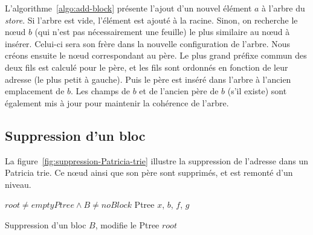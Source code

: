L'algorithme~\ref{algo:add-block} présente l'ajout d'un nouvel élément $a$ à
l'arbre du {\em store}.
Si l'arbre est vide, l'élément est ajouté à la racine.
Sinon, on recherche le n\oe{}ud $b$ (qui n'est pas nécessairement une feuille)
le plus similaire au n\oe{}ud à insérer.
Celui-ci sera son frère dans la nouvelle configuration de l'arbre.
Nous créons ensuite le n\oe{}ud correspondant au père.
Le plus grand préfixe commun des deux fils est calculé pour le père, et les fils
sont ordonnés en fonction de leur adresse (le plus petit à gauche).
Puis le père est inséré dans l'arbre à l'ancien emplacement de $b$.
Les champs de $b$ et de l'ancien père de $b$ (s'il existe) sont également mis à
jour pour maintenir la cohérence de l'arbre.


\subsection{Suppression d'un bloc}


La figure~\ref{fig:suppression-Patricia-trie} illustre la suppression de
l'adresse  dans un Patricia trie.
Ce n\oe{}ud ainsi que son père  sont supprimés, et
 est remonté d'un niveau.




\begin{algorithm}[tb]
\begin{algorithmic}[1]
\Require $root \neq emptyPtree \land B \neq noBlock$
\Statex
{}
\Statex Ptree $x$, $b$, $f$, $g$
  \Else
  \EndIf
\EndWhile
{}
\Else
  \EndIf
  \EndIf
\EndIf
\EndProcedure
\end{algorithmic}
\caption{Suppression d'un bloc $B$, modifie le Ptree $root$
  \label{algo:rem-block}}
\end{algorithm}

